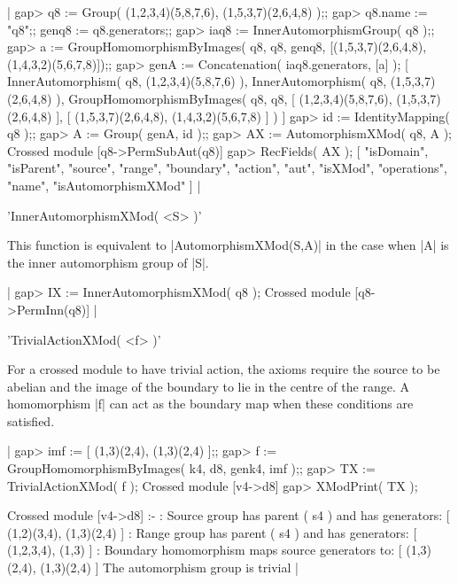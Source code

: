 |    gap> q8 := Group( (1,2,3,4)(5,8,7,6), (1,5,3,7)(2,6,4,8) );;
    gap> q8.name := "q8";; genq8 := q8.generators;;
    gap> iaq8 := InnerAutomorphismGroup( q8 );;
    gap> a := GroupHomomorphismByImages( q8, q8, genq8,
                  [(1,5,3,7)(2,6,4,8),(1,4,3,2)(5,6,7,8)]);;
    gap> genA := Concatenation( iaq8.generators, [a] );
    [ InnerAutomorphism( q8, (1,2,3,4)(5,8,7,6) ), 
      InnerAutomorphism( q8, (1,5,3,7)(2,6,4,8) ), 
      GroupHomomorphismByImages( q8, q8, [ (1,2,3,4)(5,8,7,6),
       (1,5,3,7)(2,6,4,8) ], [ (1,5,3,7)(2,6,4,8), (1,4,3,2)(5,6,7,8) ] ) ]
    gap> id := IdentityMapping( q8 );;
    gap> A := Group( genA, id );;
    gap> AX := AutomorphismXMod( q8, A );
    Crossed module [q8->PermSubAut(q8)] 
    gap> RecFields( AX );
    [ "isDomain", "isParent", "source", "range", "boundary", "action",
      "aut", "isXMod", "operations", "name", "isAutomorphismXMod" ]       |

  
%

'InnerAutomorphismXMod( <S> )'

This function is equivalent to  |AutomorphismXMod(S,A)|
in the case when |A| is the inner automorphism group of |S|.

|    gap> IX := InnerAutomorphismXMod( q8 );
    Crossed module [q8->PermInn(q8)]   |

%

'TrivialActionXMod( <f> )'

For a crossed module to have trivial action, the axioms require
the source to be abelian and the image of the boundary to lie
in the centre of the range.  A homomorphism |f| can act as the
boundary map when these conditions are satisfied.

|    gap> imf := [ (1,3)(2,4), (1,3)(2,4) ];;
    gap> f := GroupHomomorphismByImages( k4, d8, genk4, imf );;
    gap> TX := TrivialActionXMod( f );
    Crossed module [v4->d8]
    gap> XModPrint( TX );

    Crossed module [v4->d8] :- 
    : Source group has parent ( s4 ) and has generators:
      [ (1,2)(3,4), (1,3)(2,4) ]
    : Range group has parent ( s4 ) and has generators:
      [ (1,2,3,4), (1,3) ]
    : Boundary homomorphism maps source generators to:
      [ (1,3)(2,4), (1,3)(2,4) ]
      The automorphism group is trivial   |


